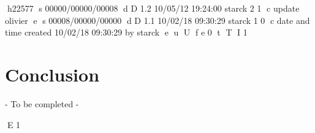 h22577
s 00000/00000/00008
d D 1.2 10/05/12 19:24:00 starck 2 1
c update olivier
e
s 00008/00000/00000
d D 1.1 10/02/18 09:30:29 starck 1 0
c date and time created 10/02/18 09:30:29 by starck
e
u
U
f e 0
t
T
I 1
\newpage
\chapter{Conclusion}
 
 - To be completed -
 
\clearpage
\newpage
E 1
